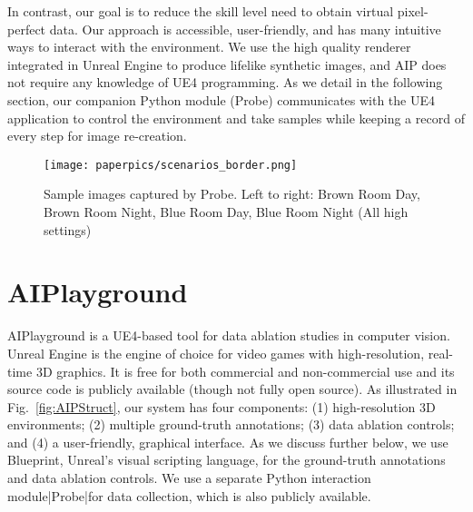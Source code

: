 \documentclass[runningheads]{llncs}
\begin{document}
In contrast, our goal is to reduce the skill level need to obtain virtual pixel-perfect data. Our approach is accessible, user-friendly, and has many intuitive ways to interact with the environment. We use the high quality renderer integrated in Unreal Engine to produce lifelike synthetic images, and AIP does not require any knowledge of UE4 programming. As we detail in the following section, our companion Python module (Probe) communicates with the UE4 application to control the environment and take samples while keeping a record of every step for image re-creation. 





\begin{figure*}[h]
\centerline{\texttt{[image: paperpics/scenarios\_border.png]}}
\caption{Sample images captured by Probe. Left to right:  Brown Room Day, Brown Room Night, Blue Room Day, Blue Room Night (All high settings)}
\label{fig:scenarios}
\vspace{-1em}
\end{figure*}

\section{AIPlayground}
\label{sec:methodology}
AIPlayground is a UE4-based tool for data ablation studies in computer vision. Unreal Engine is the engine of choice for video games with high-resolution, real-time 3D graphics. It is free for both commercial and non-commercial use and its source code is publicly available (though not fully open source). As illustrated in Fig.~\ref{fig:AIPStruct}, our system has four components: (1) high-resolution 3D environments; (2) multiple ground-truth annotations; (3) data ablation controls; and (4) a user-friendly, graphical interface. As we discuss further below, we use Blueprint, Unreal's visual scripting language, for the ground-truth annotations and data ablation controls. We use a separate Python interaction module|Probe|for data collection, which is also publicly available. 
\end{document}
